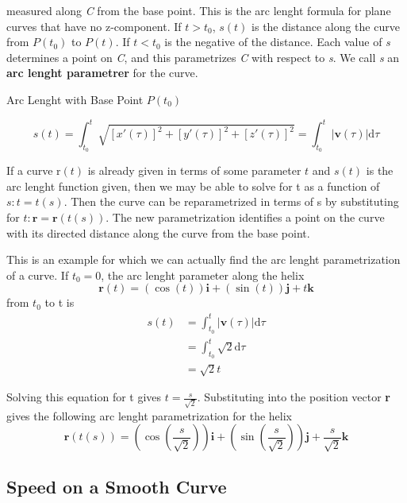 \documentclass[12pt,a4paper]{article}
\newenvironment{ruleBox}[1]{\begin{rulebox}{#1}}{\end{rulebox}\vspace{1\baselineskip}}
\begin{document}
measured along \textit{C} from the base point. This is the arc  lenght formula for plane curves that have no z-component. If \(t>t_0\), \(s(t)\) is the distance along the curve from \(P(t_0)\) to \(P(t)\). If \(t < t_0\) is the negative of the distance.
Each value of \textit{s} determines a point on \textit{C}, and this parametrizes \textit{C} with respect to \textit{s}. We call \textit{s} an \textbf{arc lenght parametrer} for the curve. 

\begin{ruleBox}{Arc Lenght with Base Point \(P(t_0)\)}

  \[s(t) = \int_{t_0}^{t}\sqrt{\left[x'(\tau)\right]^2+\left[y'(\tau)\right]^2+\left[z'(\tau)\right]^2} = \int_{t_0}^{t}|\mathbf{v}(\tau)|\mathrm{d}\tau\]
\end{ruleBox}

If a curve \(\mathrm{r}(t)\) is already given in terms of some parameter \(t\) and \(s(t)\) is the arc lenght function given, then we may be able to solve for t as a function of \(s: t = t(s)\). Then the curve can be reparametrized in terms of s by substituting for \(t: \mathbf{r} = \mathbf{r}(t(s))\). The new parametrization identifies a point on the curve with its directed distance along the curve from the base point.

\newpage

\begin{example}
  This is an example for which we can actually find the arc lenght parametrization of a curve. If \(t_0=0\), the arc lenght parameter along the helix
  \[\mathbf{r}(t)=(\cos(t))\mathbf{i}+(\sin(t))\mathbf{j}+t\mathbf{k}\]
  from \(t_0\) to t is
  \begin{align*}
    s(t) &= \int_{t_0}^{t}|\mathbf{v}(\tau)|\mathrm{d}\tau\\
    &= \int_{t_0}^{t}\sqrt{2}\mathrm{d}\tau\\
    &= \sqrt{2}t
  \end{align*}

  Solving this equation for t gives \(t = \frac{s}{\sqrt{2}}\). Substituting into the position vector \textbf{r} gives the following arc lenght parametrization for the helix
  \[\mathbf{r}(t(s)) = \left(\cos\left(\frac{s}{\sqrt2}\right)\right)\mathbf{i} + \left(\sin\left(\frac{s}{\sqrt2}\right)\right)\mathbf{j}  + \frac{s}{\sqrt2}\mathbf{k}\]
  
\end{example}

\subsection{Speed on a Smooth Curve}
\end{document}
